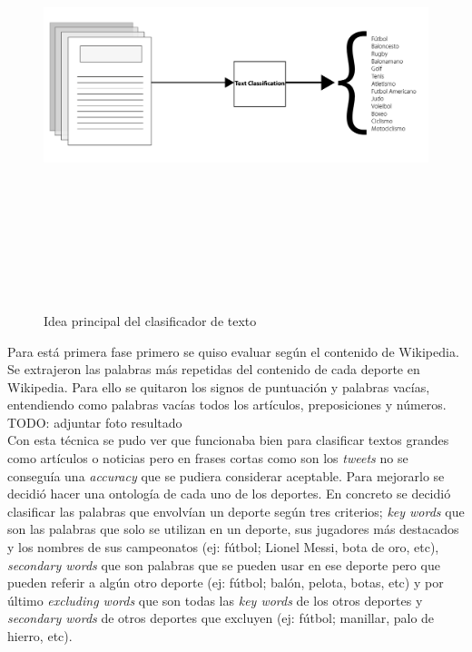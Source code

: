 \documentclass[../all.tex]{subfiles}
\begin{document}
\begin{figure}[H]
    \centering
    \includegraphics[height=13cm, width=15cm]{imgs/textClassification.png}
    \caption{Idea principal del clasificador de texto}
\end{figure}


Para está primera fase primero se quiso evaluar según el contenido de Wikipedia. Se extrajeron las palabras más repetidas del contenido de cada deporte en Wikipedia. Para ello se quitaron los signos de puntuación y palabras vacías, entendiendo como palabras vacías todos los artículos, preposiciones y números. {\color{red} TODO: adjuntar foto resultado}\\

Con esta técnica se pudo ver que funcionaba bien para clasificar textos grandes como artículos o noticias pero en frases cortas como son los \textit{tweets} no se conseguía una \textit{accuracy} que se pudiera considerar aceptable. Para mejorarlo se decidió hacer una ontología de cada uno de los deportes. En concreto se decidió clasificar las palabras que envolvían un deporte según tres criterios; \textit{key words} que son las palabras que solo se utilizan en un deporte, sus jugadores más destacados y los nombres de sus campeonatos (ej: fútbol; Lionel Messi, bota de oro, etc), \textit{secondary words} que son palabras que se pueden usar en ese deporte pero que pueden referir a algún otro deporte (ej: fútbol; balón, pelota, botas, etc) y por último \textit{excluding words} que son todas las \textit{key words} de los otros deportes y \textit{secondary words} de otros deportes que excluyen (ej: fútbol; manillar, palo de hierro, etc).\\
\end{document}
